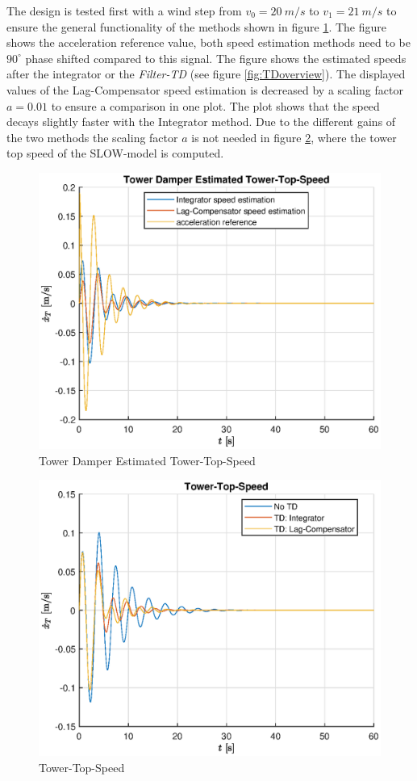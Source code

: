 The design is tested first with a wind step from $v_0 = \SI{20}{m/s}$ to $v_1 = \SI{21}{m/s}$ to ensure the general functionality of the methods shown in figure \ref{fig:TDWindStepEst}. The figure shows the acceleration reference value, both speed estimation methods need to be $90^{\circ}$ phase shifted compared to this signal. The figure shows the estimated speeds after the integrator or the \textit{Filter-TD} (see figure \ref{fig:TDoverview}). The displayed values of the Lag-Compensator speed estimation is decreased by a scaling factor $a = 0.01$ to ensure a comparison in one plot. The plot shows that the speed decays slightly faster with the Integrator method. Due to the different gains of the two methods the scaling factor $a$ is not needed in figure \ref{fig:TDWindStep}, where the tower top speed of the SLOW-model is computed. 
\begin{figure}[tbh]
	\centering	
	\includegraphics[width=12cm]{Figures/WindStepEst.eps}
	\caption{Tower Damper Estimated Tower-Top-Speed}
	\label{fig:TDWindStepEst}
\end{figure}
\begin{figure}[tbh]
	\centering	
	\includegraphics[width=12cm]{Figures/WindStep.eps}
	\caption{Tower-Top-Speed}
	\label{fig:TDWindStep}
\end{figure}

